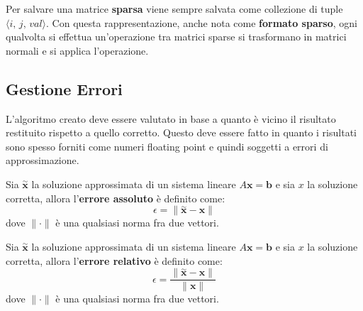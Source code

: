 Per salvare una matrice \textbf{sparsa} viene sempre salvata come collezione di
tuple $\langle i, \, j,\, val\rangle$. Con questa rappresentazione, anche nota
come \textbf{formato sparso}, ogni qualvolta si effettua un'operazione tra matrici
sparse si trasformano in matrici normali e si applica l'operazione.
\subsection{Gestione Errori}
L'algoritmo creato deve essere valutato in base a quanto è vicino il risultato
restituito rispetto a quello corretto. Questo deve essere fatto in quanto
i risultati sono spesso forniti come numeri floating point e quindi soggetti
a errori di approssimazione.

\begin{definizione}
    Sia $\stackrel{\sim}{\textbf{x}}$ la soluzione approssimata di un sistema
    lineare $A\textbf{x} = \textbf{b}$ e sia $x$ la soluzione corretta, allora
    l'\textbf{errore assoluto} è definito come:
    \begin{equation}
        \epsilon = \|\stackrel{\sim}{\textbf{x}} - \textbf{x}\|
    \end{equation}
    dove $\|\cdot\|$ è una qualsiasi norma fra due vettori.
\end{definizione}
\begin{definizione}
    Sia $\stackrel{\sim}{\textbf{x}}$ la soluzione approssimata di un sistema
    lineare $A\textbf{x} = \textbf{b}$ e sia $x$ la soluzione corretta, allora
    l'\textbf{errore relativo} è definito come:
    \begin{equation}
        \epsilon = \frac{\|\stackrel{\sim}{\textbf{x}} - \textbf{x}\|}{\|\textbf{x}\|}
    \end{equation}
    dove $\|\cdot\|$ è una qualsiasi norma fra due vettori.
\end{definizione}

